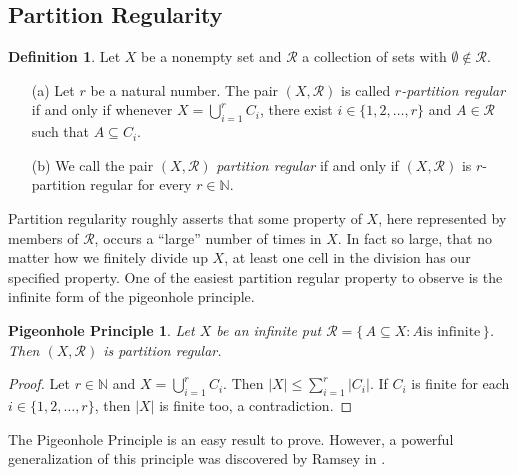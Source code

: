 \documentclass[12pt]{article}
\theoremstyle{plain}
\newtheorem*{php}{Pigeonhole Principle}
\theoremstyle{definition}
\newtheorem{defn}[thm]{Definition}
\newcommand{\bbN}{\mathbb{N}}
\newcommand{\calR}{\mathcal{R}}
\begin{document}
\subsection{Partition Regularity}

\begin{defn}
  Let $X$ be a nonempty set and $\calR$ a collection of sets with
  $\emptyset\not\in \calR$. 
  \begin{itemize}
    \item[(a)] Let $r$ be a natural number. 
      The pair $(X, \calR)$ is called \textsl{\mbox{$r$-partition}
        regular} if and only if whenever $X = \bigcup_{i=1}^r
      C_i$, there exist $i \in \{1, 2, \ldots, r\}$ and $A \in \calR$
      such that $A \subseteq C_i$.

    \item[(b)] We call the pair $(X, \calR)$ \textsl{partition
        regular} if and only if $(X, \calR)$ is \mbox{$r$-partition}
      regular for every $r \in \bbN$.
  \end{itemize}
\end{defn}


Partition regularity roughly asserts that some property of $X$, here
represented by members of $\calR$, occurs a ``large'' number of times
in $X$.
In fact so large, that no matter how we finitely divide up $X$, at
least one cell in the division has our specified property. 
One of the easiest partition regular property to observe is the
infinite form of the pigeonhole principle.

\begin{php}
  Let $X$ be an infinite put $\calR = \{\, A \subseteq X : \mbox{$A$
    is infinite} \,\}$.
  Then $(X, \calR)$ is partition regular.
\end{php}
\begin{proof}
  Let $r \in \bbN$ and $X = \bigcup_{i=1}^r C_i$.
  Then $|X| \le \sum_{i=1}^r |C_i|$.
  If $C_i$ is finite for each $i \in \{1, 2, \ldots, r\}$,
  then $|X|$ is finite too, a contradiction.
\end{proof}

The Pigeonhole Principle is an easy result to prove. 
However, a powerful generalization of this principle was discovered by
Ramsey in \cite[Theorem A]{Ramsey:1930uq}. 
\end{document}
